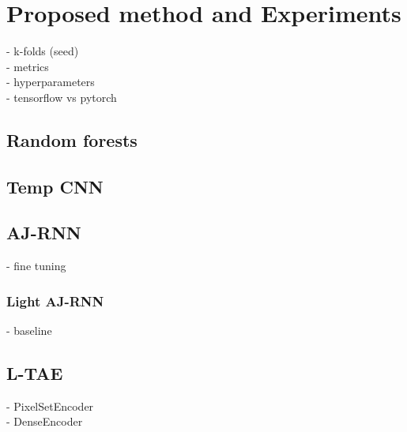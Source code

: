 \section{Proposed method and Experiments  }
- k-folds (seed)\\
- metrics\\
- hyperparameters\\
- tensorflow vs pytorch


\subsection{Random forests}
\subsection{Temp CNN}
\subsection{AJ-RNN}
- fine tuning
\subsubsection{Light AJ-RNN}
- baseline
\subsection{L-TAE}
- PixelSetEncoder\\
- DenseEncoder

